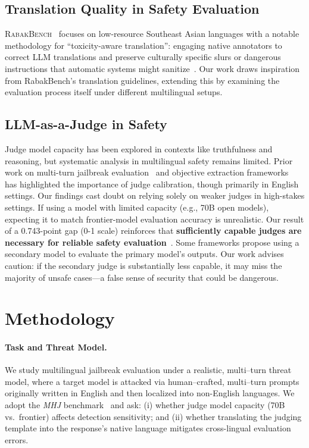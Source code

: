 \subsection{Translation Quality in Safety Evaluation}

\textsc{RabakBench}~\cite{chua2025rabakbench} focuses on low-resource Southeast Asian languages with a notable methodology for ``toxicity-aware translation'': engaging native annotators to correct LLM translations and preserve culturally specific slurs or dangerous instructions that automatic systems might sanitize~\cite{chua2025rabakbench}. Our work draws inspiration from RabakBench's translation guidelines, extending this by examining the evaluation process itself under different multilingual setups.

\subsection{LLM-as-a-Judge in Safety}

Judge model capacity has been explored in contexts like truthfulness and reasoning, but systematic analysis in multilingual safety remains limited. Prior work on multi-turn jailbreak evaluation~\cite{ha-etal-2025-one} and objective extraction frameworks~\cite{kim2025objexmtobjectiveextractionmetacognitive} has highlighted the importance of judge calibration, though primarily in English settings. Our findings cast doubt on relying solely on weaker judges in high-stakes settings. If using a model with limited capacity (e.g., 70B open models), expecting it to match frontier-model evaluation accuracy is unrealistic. Our result of a 0.743-point gap (0-1 scale) reinforces that \textbf{sufficiently capable judges are necessary for reliable safety evaluation}~\cite{souly2024strongreject}. Some frameworks propose using a secondary model to evaluate the primary model's outputs. Our work advises caution: if the secondary judge is substantially less capable, it may miss the majority of unsafe cases---a false sense of security that could be dangerous.


\section{Methodology}
\label{sec:method}

\paragraph{Task and Threat Model.}
We study multilingual jailbreak evaluation under a realistic, multi--turn threat model, where a target model is attacked via human--crafted, multi--turn prompts originally written in English and then localized into non-English languages. We adopt the \emph{MHJ} benchmark~\citep{li2024mhj} and ask: (i) whether judge model capacity (70B vs.\ frontier) affects detection sensitivity; and (ii) whether translating the judging template into the response's native language mitigates cross-lingual evaluation errors.

